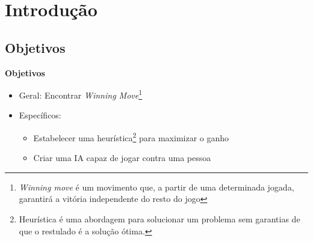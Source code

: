 \section{Introdução}
\subsection{Objetivos}
\begin{frame}
	\textbf{Objetivos}
	\begin{itemize}
		\item Geral: Encontrar \emph{Winning Move}\footnote{\emph{Winning move} é um movimento que, a partir de uma determinada jogada, garantirá a vitória independente do resto do jogo}
		\pause
		\item Específicos:
		\begin{itemize}
			\item Estabelecer uma heurística\footnote{Heurística é uma abordagem para solucionar um problema sem garantias de que o restulado é a solução ótima.} para maximizar o ganho
			\pause
			\item Criar uma IA capaz de jogar contra uma pessoa
		\end{itemize}
	\end{itemize}
\end{frame}
